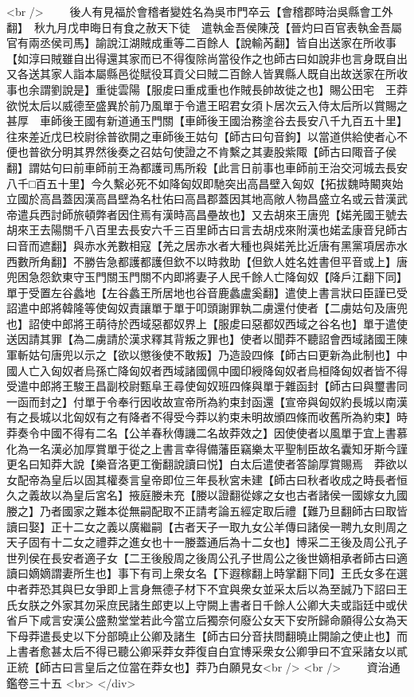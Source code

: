 <br />
　　後人有見福於會稽者變姓名為吳市門卒云【會稽郡時治吳縣會工外翻】　秋九月戊申晦日有食之赦天下徒　遣執金吾侯陳茂【晉灼曰百官表執金吾屬官有兩丞侯司馬】諭說江湖賊成重等二百餘人【說輸芮翻】皆自出送家在所收事【如淳曰賊雖自出得還其家而已不得復除尚當役作之也師古曰如說非也言身既自出又各送其家人詣本屬縣邑從賦役耳貢父曰賊二百餘人皆異縣人既自出故送家在所收事也余謂劉說是】重徙雲陽【服䖍曰重成重也作賊長帥故徙之也】賜公田宅　王莽欲悦太后以威德至盛異於前乃風單于令遣王昭君女須卜居次云入侍太后所以賞賜之甚厚　車師後王國有新道通玉門關【車師後王國治務塗谷去長安八千九百五十里】往來差近戊巳校尉徐普欲開之車師後王姑句【師古曰句音鉤】以當道供給使者心不便也普欲分明其界然後奏之召姑句使證之不肯繫之其妻股紫陬【師古曰陬音子侯翻】謂姑句曰前車師前王為都護司馬所殺【此言日前事也車師前王治交河城去長安八千□百五十里】今久繫必死不如降匈奴即馳突出高昌壁入匈奴【拓拔魏時闞爽始立國於高昌蓋因漢高昌壁為名杜佑曰高昌郡蓋因其地高敞人物昌盛立名或云昔漢武帝遣兵西討師旅頓弊者因住焉有漢時高昌壘故也】又去胡來王唐兜【婼羌國王號去胡來王去陽關千八百里去長安六千三百里師古曰言去胡戍來附漢也婼孟康音兒師古曰音而遮翻】與赤水羌數相寇【羌之居赤水者大種也與婼羌比近唐有黑黨項居赤水西數所角翻】不勝告急都護都護但欽不以時救助【但欽人姓名姓書但平音或上】唐兜困急怨欽東守玉門關玉門關不内即將妻子人民千餘人亡降匈奴【降戶江翻下同】單于受置左谷蠡地【左谷蠡王所居地也谷音鹿蠡盧奚翻】遣使上書言狀曰臣謹已受詔遣中郎將韓隆等使匈奴責讓單于單于叩頭謝罪執二虜還付使者【二虜姑句及唐兜也】詔使中郎將王萌待於西域惡都奴界上【服䖍曰惡都奴西域之谷名也】單于遣使送因請其罪【為二虜請於漢求釋其背叛之罪也】使者以聞莽不聽詔會西域諸國王陳軍斬姑句唐兜以示之【欲以懲後使不敢叛】乃造設四條【師古曰更新為此制也】中國人亡入匈奴者烏孫亡降匈奴者西域諸國佩中國印綬降匈奴者烏桓降匈奴者皆不得受遣中郎將王駿王昌副校尉甄阜王尋使匈奴班四條與單于雜函封【師古曰與璽書同一函而封之】付單于令奉行因收故宣帝所為約束封函還【宣帝與匈奴約長城以南漢有之長城以北匈奴有之有降者不得受今莽以約束未明故頒四條而收舊所為約束】時莽奏令中國不得有二名【公羊春秋傳譏二名故莽效之】因使使者以風單于宜上書慕化為一名漢必加厚賞單于從之上書言幸得備藩臣竊樂太平聖制臣故名囊知牙斯今謹更名曰知莽大說【樂音洛更工衡翻說讀曰悦】白太后遣使者答諭厚賞賜焉　莽欲以女配帝為皇后以固其權奏言皇帝即位三年長秋宮未建【師古曰秋者收成之時長者恒久之義故以為皇后宮名】掖庭媵未充【媵以證翻從嫁之女也古者諸侯一國嫁女九國媵之】乃者國家之難本從無嗣配取不正請考論五經定取后禮【難乃旦翻師古曰取皆讀曰娶】正十二女之義以廣繼嗣【古者天子一取九女公羊傳曰諸侯一聘九女則周之天子固有十二女之禮莽之進女也十一媵蓋通后為十二女也】博采二王後及周公孔子世列侯在長安者適子女【二王後殷周之後周公孔子世周公之後世嫡相承者師古曰適讀曰嫡嫡謂妻所生也】事下有司上衆女名【下遐稼翻上時掌翻下同】王氏女多在選中者莽恐其與巳女爭即上言身無德子材下不宜與衆女並采太后以為至誠乃下詔曰王氏女朕之外家其勿采庶民諸生郎吏以上守闕上書者日千餘人公卿大夫或詣廷中或伏省戶下咸言安漢公盛勲堂堂若此今當立后獨奈何廢公女天下安所歸命願得公女為天下母莽遣長史以下分部曉止公卿及諸生【師古曰分音扶問翻曉止開諭之使止也】而上書者愈甚太后不得已聽公卿采莽女莽復自白宜博采衆女公卿爭曰不宜采諸女以貳正統【師古曰言皇后之位當在莽女也】莽乃白願見女<br />
<br />
　　資治通鑑卷三十五  <br>
   </div> 

